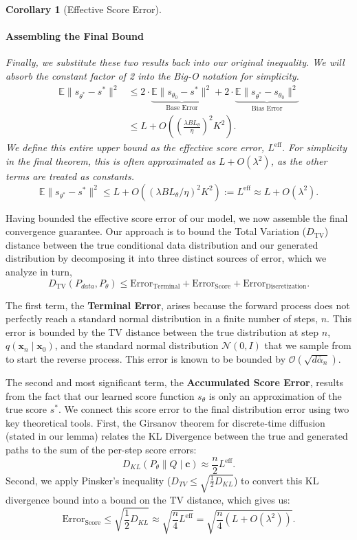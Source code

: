 \documentclass{article}
\newtheorem{corollary}[theorem]{Corollary}
\begin{document}
\begin{corollary}[Effective Score Error]
\paragraph{Assembling the Final Bound}
Finally, we substitute these two results back into our original inequality. We will absorb the constant factor of 2 into the Big-O notation for simplicity.
\begin{align*}
    \mathbb{E} \|s_{\theta^*} - s^*\|^2 &\le 2 \cdot \underbrace{\mathbb{E} \|s_{\theta_0} - s^*\|^2}_{\text{Base Error}} + 2 \cdot \underbrace{\mathbb{E} \|s_{\theta^*} - s_{\theta_0}\|^2}_{\text{Bias Error}} \\
    &\le L + O\left(\left(\frac{\lambda B L_\theta}{\eta}\right)^2 K^2\right).
\end{align*}
We define this entire upper bound as the effective score error, $L^{\text{eff}}$. For simplicity in the final theorem, this is often approximated as $L + O(\lambda^2)$, as the other terms are treated as constants.
\[
\mathbb{E} \|s_{\theta^*} - s^*\|^2 \le L + O\left((\lambda B L_\theta / \eta)^2 K^2\right) := L^{\text{eff}} \approx L + O(\lambda^2).
\]

\end{corollary}

Having bounded the effective score error of our model, we now assemble the final convergence guarantee. Our approach is to bound the Total Variation ($D_{\text{TV}}$) distance between the true conditional data distribution and our generated distribution by decomposing it into three distinct sources of error, which we analyze in turn,
\begin{equation} \label{eq:error_decomp}
    D_{\text{TV}}(P_{data}, P_\theta) \le \text{Error}_{\text{Terminal}} + \text{Error}_{\text{Score}} + \text{Error}_{\text{Discretization}}.
\end{equation}

The first term, the \textbf{Terminal Error}, arises because the forward process does not perfectly reach a standard normal distribution in a finite number of steps, $n$. This error is bounded by the TV distance between the true distribution at step $n$, $q(\mathbf{x}_n \mid \mathbf{x}_0)$, and the standard normal distribution $\mathcal{N}(0, I)$ that we sample from to start the reverse process. This error is known to be bounded by $\mathcal{O}(\sqrt{d \bar{\alpha}_n})$.

The second and most significant term, the \textbf{Accumulated Score Error}, results from the fact that our learned score function $s_\theta$ is only an approximation of the true score $s^*$. We connect this score error to the final distribution error using two key theoretical tools. First, the Girsanov theorem for discrete-time diffusion (stated in our lemma) relates the KL Divergence between the true and generated paths to the sum of the per-step score errors:
\[
D_{KL}(P_\theta \| Q \mid \mathbf{c}) \approx \frac{n}{2} L^{\text{eff}}.
\]
Second, we apply Pinsker's inequality ($D_{TV} \le \sqrt{\frac{1}{2} D_{KL}}$) to convert this KL divergence bound into a bound on the TV distance, which gives us:
\[
\text{Error}_{\text{Score}} \le \sqrt{\frac{1}{2} D_{KL}} \approx \sqrt{\frac{n}{4} L^{\text{eff}}} = \sqrt{\frac{n}{4} (L + O(\lambda^2))}.
\]
\end{document}
